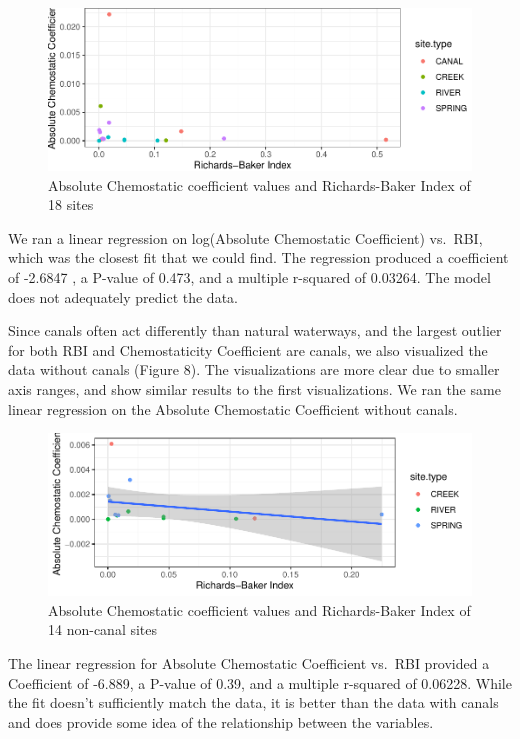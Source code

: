 \documentclass[12pt,]{article}
\begin{document}
\begin{figure}
\centering
\includegraphics{Final-Project-Report_files/figure-latex/unnamed-chunk-10-1.pdf}
\caption{Absolute Chemostatic coefficient values and Richards-Baker
Index of 18 sites}
\end{figure}

We ran a linear regression on log(Absolute Chemostatic Coefficient)
vs.~RBI, which was the closest fit that we could find. The regression
produced a coefficient of -2.6847 , a P-value of 0.473, and a multiple
r-squared of 0.03264. The model does not adequately predict the data.

Since canals often act differently than natural waterways, and the
largest outlier for both RBI and Chemostaticity Coefficient are canals,
we also visualized the data without canals (Figure 8). The
visualizations are more clear due to smaller axis ranges, and show
similar results to the first visualizations. We ran the same linear
regression on the Absolute Chemostatic Coefficient without canals.

\begin{figure}
\centering
\includegraphics{Final-Project-Report_files/figure-latex/unnamed-chunk-12-1.pdf}
\caption{Absolute Chemostatic coefficient values and Richards-Baker
Index of 14 non-canal sites}
\end{figure}

The linear regression for Absolute Chemostatic Coefficient vs.~RBI
provided a Coefficient of -6.889, a P-value of 0.39, and a multiple
r-squared of 0.06228. While the fit doesn't sufficiently match the data,
it is better than the data with canals and does provide some idea of the
relationship between the variables.
\end{document}
